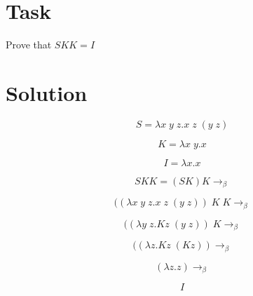 \documentclass[12pt]{report}
\begin{document}
\section*{Task}

Prove that $S K K = I$ \newline

\section*{Solution}

$$S = \lambda x\; y\; z.x\; z\; (y\; z)$$

$$K = \lambda x\; y.x$$

$$I = \lambda x.x$$

$$S K K = (S K) K \rightarrow_\beta$$

$$((\lambda x\; y\; z.x\; z\; (y\; z))\; K\; K\rightarrow_\beta$$

$$((\lambda y\; z.K z\; (y\; z))\; K\rightarrow_\beta$$

$$((\lambda z.K z\; (K z))\rightarrow_\beta$$

$$(\lambda z.z)\rightarrow_\beta$$

$$I$$
\end{document}
